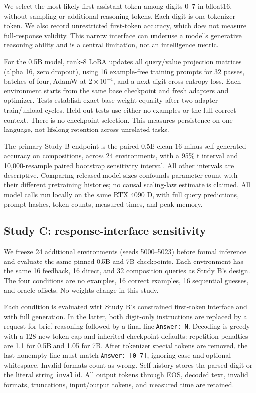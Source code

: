 \documentclass[11pt]{article}
\begin{document}
We select the most likely first assistant token among digits 0--7 in bfloat16,
without sampling or additional reasoning tokens. Each digit is one tokenizer
token. We also record unrestricted first-token accuracy, which does not measure
full-response validity. This narrow interface can underuse a model's generative
reasoning ability and is a central limitation, not an intelligence metric.

For the 0.5B model, rank-8 LoRA updates all query/value projection matrices
(alpha 16, zero dropout), using 16 example-free training prompts for 32 passes,
batches of four, AdamW at $2\times10^{-4}$, and a next-digit cross-entropy loss.
Each environment starts from the same base checkpoint and fresh adapters and
optimizer. Tests establish exact base-weight equality after two adapter
train/unload cycles. Held-out tests use either no examples or the full correct
context. There is no checkpoint selection. This measures persistence on one
language, not lifelong retention across unrelated tasks.

The primary Study B endpoint is the paired 0.5B clean-16 minus self-generated
accuracy on compositions, across 24 environments, with a 95\% t interval and
10,000-resample paired bootstrap sensitivity interval. All other intervals
are descriptive. Comparing released model sizes confounds parameter count
with their different pretraining histories; no causal scaling-law estimate is
claimed. All model calls run locally on the same RTX 4090 D, with full query
predictions, prompt hashes, token counts, measured times, and peak memory.

\subsection{Study C: response-interface sensitivity}
We freeze 24 additional environments (seeds 5000--5023) before formal inference
and evaluate the same pinned 0.5B and 7B checkpoints. Each environment has the
same 16 feedback, 16 direct, and 32 composition queries as Study B's design.
The four conditions are no examples, 16 correct examples, 16 sequential guesses,
and oracle offsets. No weights change in this study.

Each condition is evaluated with Study B's constrained first-token interface
and with full generation. In the latter, both digit-only instructions are
replaced by a request for brief reasoning followed by a final line
\texttt{Answer: N}. Decoding is greedy with a 128-new-token cap and inherited
checkpoint defaults: repetition penalties are 1.1 for 0.5B and 1.05 for 7B.
After tokenizer special tokens are removed, the last nonempty line must match
\texttt{Answer: [0--7]}, ignoring case and optional whitespace. Invalid formats
count as wrong. Self-history stores the parsed digit or the literal string
\texttt{invalid}. All output tokens through EOS, decoded text, invalid formats,
truncations, input/output tokens, and measured time are retained.
\end{document}
